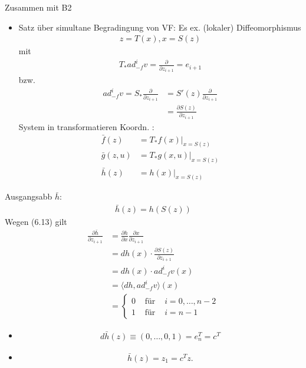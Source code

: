 \documentclass[ngerman]{tudscrreprt}
\begin{document}
Zusammen mit B2 \begin{itemize}
\item Satz über simultane Begradingung von VF: Es ex. (lokaler) Diffeomorphismus \begin{align*}
z = T(x), x = S(z) \tag{ 6.13}
\end{align*}mit \begin{align*}
T_{*}ad_{-f}^{i}v = \frac{\partial }{\partial z_{i+1}} = e_{i+1}
\end{align*}
bzw. \begin{align*}
ad_{-f}^i v = S_{*} \frac{\partial }{\partial  z_{i+1}} &= S'(z) \frac{\partial}{\partial z_{i+1}}\\ 
&= \frac{\partial S(z)}{\partial z_{i+1}}
\end{align*}
System in transformatieren Koordn. : \begin{align*}
\bar f(z) &= T_{*} f(x)|_{x = S(z)}\\ 
\bar g(z,u) &= T_{*} g(x,u)|_{x = S(z)}\\ 
\bar h(z) &= h(x)|_{x= S(z)} \tag{6.14}
\end{align*}
\end{itemize}
Ausgangsabb $\bar h:$ \begin{align*}
\bar h (z) = h(S(z))
\end{align*}Wegen (6.13) gilt \begin{align*}
\frac{\partial \bar h}{\partial z_{i+1}} &= \frac{\partial h}{\partial x} \frac{\partial x}{\partial z_{i+1}}\\ 
&= dh(x) \cdot \frac{\partial S(z)}{\partial z_{i+1}}\\ 
&= dh(x) \cdot ad_{-f}^i v(x)\\ 
&= \langle dh, ad_{-f}^i v \rangle (x)\\ 
&= \left\{ \begin{matrix} 0 & \text{ für } & i = 0,\dots, n-2\\ 
1 & \text{ für }& i = n-1\end{matrix}
 \right.
\end{align*}
\begin{itemize}
\item \begin{align*}
d\bar h(z) \equiv (0, \dots, 0, 1) = e_n^T = c^T
\end{align*}
\item \begin{align*}
\bar h(z) = z_1 = c^T z. 
\end{align*}
\end{itemize}
\end{document}
